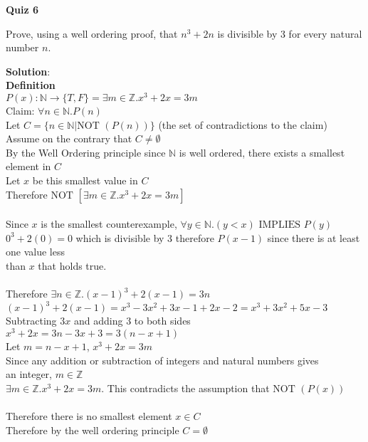 \documentclass[11pt]{article}
\def\nats{{\mathbb N}}
\def\ints{{\mathbb Z}}
\newcommand{\Implies}{\mbox{ IMPLIES }}
\newcommand{\Not}{\mbox{NOT }}
\begin{document}
{\bf \large Quiz 6}

\begin{question}
Prove, using a well ordering proof, that $n^3 +2n$ is divisible by 3 for every natural number $n$.
\end{question}

\begin{solution}
{\bf Solution}:\\
{\bf Definition}\\
$P(x): \nats \rightarrow \{T,F\} = \exists m \in\ints. x^3+2x = 3m$\\

Claim: $\forall n\in \nats.P(n)$\\
Let $C= \{n\in \nats|\Not(P(n))\}$ (the set of contradictions to the claim)\\
\null\quad Assume on the contrary that $C\ne \emptyset$\\
\null\quad By the Well Ordering principle since $\nats$  is well ordered, there exists a smallest element in $C$\\
\null\qquad Let $x$ be this smallest value in $C$\\
\null\qquad Therefore $\Not\left[\exists m\in\ints.x^3+2x= 3m\right]$\\\\
\null\qquad Since $x$ is the smallest counterexample, $\forall y\in\nats.(y<x)\Implies P(y)$\\
\null\qquad $0^3+2(0)=0$ which is divisible by 3 therefore $P(x-1)$ since there is at least one value less \\
\null\qquad than $x$ that holds true.\\\\
\null\qquad Therefore $\exists n\in\ints.(x-1)^3+2(x-1)=3n$\\
\null\qquad $(x-1)^3+2(x-1)=x^3-3x^2+3x-1 + 2x-2= x^3+3x^2+5x-3$\\
\null\qquad Subtracting $3x$ and adding $3$ to both sides $x^3+2x=3n-3x+3=3(n-x+1)$ \\
\null\qquad Let $m=n-x+1$, $x^3+2x=3m$\\
\null\qquad Since any addition or subtraction of integers and natural numbers gives\\
\null\qquad an integer, $m\in\ints$\\
\null\qquad $\exists m\in \ints.x^3+2x=3m$. This contradicts the assumption that $\Not(P(x))$\\\\
\null\quad Therefore there is no smallest element $x\in C$\\
Therefore by the well ordering principle  $C=\emptyset$\\
\end{solution}
\end{document}
